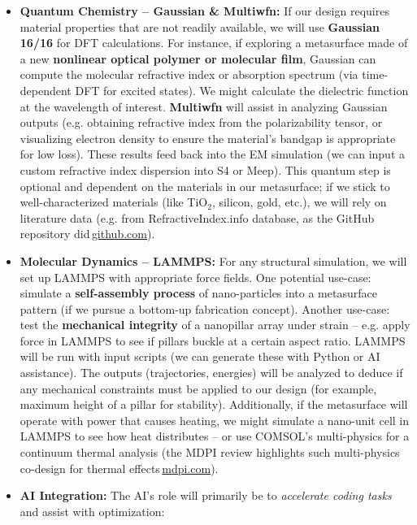 \documentclass[11pt]{article}
\begin{document}
\begin{itemize}
  \item \textbf{Quantum Chemistry -- Gaussian \& Multiwfn:} If our design requires material properties that are not readily available, we will use \textbf{Gaussian 16/16} for DFT calculations. For instance, if exploring a metasurface made of a new \textbf{nonlinear optical polymer or molecular film}, Gaussian can compute the molecular refractive index or absorption spectrum (via time-dependent DFT for excited states). We might calculate the dielectric function at the wavelength of interest. \textbf{Multiwfn} will assist in analyzing Gaussian outputs (e.g. obtaining refractive index from the polarizability tensor, or visualizing electron density to ensure the material's bandgap is appropriate for low loss). These results feed back into the EM simulation (we can input a custom refractive index dispersion into S4 or Meep). This quantum step is optional and dependent on the materials in our metasurface; if we stick to well-characterized materials (like TiO$_2$, silicon, gold, etc.), we will rely on literature data (e.g. from RefractiveIndex.info database, as the GitHub repository did\,\href{https://github.com/hzzg0727/Metasurface-Design#:~:text=material}{github.com}).
  \item \textbf{Molecular Dynamics -- LAMMPS:} For any structural simulation, we will set up LAMMPS with appropriate force fields. One potential use-case: simulate a \textbf{self-assembly process} of nano-particles into a metasurface pattern (if we pursue a bottom-up fabrication concept). Another use-case: test the \textbf{mechanical integrity} of a nanopillar array under strain -- e.g. apply force in LAMMPS to see if pillars buckle at a certain aspect ratio. LAMMPS will be run with input scripts (we can generate these with Python or AI assistance). The outputs (trajectories, energies) will be analyzed to deduce if any mechanical constraints must be applied to our design (for example, maximum height of a pillar for stability). Additionally, if the metasurface will operate with power that causes heating, we might simulate a nano-unit cell in LAMMPS to see how heat distributes -- or use COMSOL's multi-physics for a continuum thermal analysis (the MDPI review highlights such multi-physics co-design for thermal effects\,\href{https://www.mdpi.com/2304-6732/12/10/947#:~:text=diverse%2C%20rapid%2C%20and%20precise%2C%20simplifying,previously%20complex%20inverse%20design%20process}{mdpi.com}).
  \item \textbf{AI Integration:} The AI's role will primarily be to \emph{accelerate coding tasks} and assist with optimization:

\end{itemize}
\end{document}
